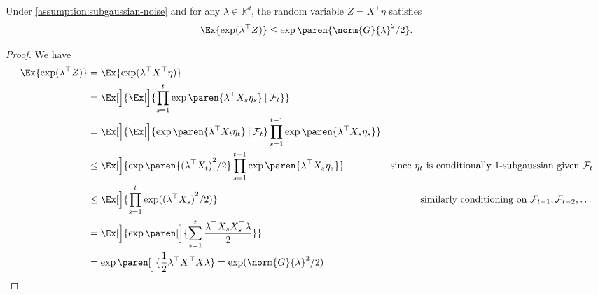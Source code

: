 \documentclass{article}
\newcommand{\Real}{\mathds{R}}
\newcommand\given[1][\delimsize]{%
  \providecommand{\delimsize}{}
  \nonscript\:#1\vert\allowbreak\nonscript\:\mathopen{}
}
\DeclarePairedDelimiter{\paren}()
\providecommand\transp{\top}
\let\transpsymbol\transp
\renewcommand{\transp}[1]{#1^\transpsymbol}
\begin{document}
\begin{lemma}\label{lemma:subgaussian-z}
  Under \cref{assumption:subgaussian-noise} and for any
$\lambda\in\Real^d$, the random variable $Z = \transp{X}\eta$ satisfies
  \begin{align*}
    \Ex{\exp(\transp{\lambda}Z)} \le \exp\paren{\norm{G}{\lambda}^2/2}.
  \end{align*}

  \begin{proof}
    We have
    \begin{align*}
      \Ex{\exp(\transp{\lambda}Z)}
      &= \Ex{\exp(\transp{\lambda}\transp{X}\eta)} \\
      &= \Ex[\Big]{\Ex[\Big]{\prod_{s=1}^t \exp\paren{\transp{\lambda}X_s\eta_s} \given \mathcal{F}_t}} \\
      &= \Ex[\Big]{\Ex[\Big]{\exp\paren{\transp{\lambda}X_t\eta_t} \given \mathcal{F}_t} \prod_{s=1}^{t-1} \exp\paren{\transp{\lambda}X_s\eta_s}} \\
      &\le \Ex[\Big]{\exp\paren{{(\transp{\lambda}X_t)}^2/2}
        \prod_{s=1}^{t-1} \exp\paren{\transp{\lambda}X_s\eta_s}}
      &\text{since $\eta_t$ is conditionally 1-subgaussian given $\mathcal{F}_t$}\\
      &\le \Ex[\Big]{\prod_{s=1}^t\exp({(\transp{\lambda}X_s)}^2/2)}
      &\text{similarly conditioning on $\mathcal{F}_{t-1},\mathcal{F}_{t-2},\dotsc$}\\
      &= \Ex[\Big]{\exp\paren[\Big]{\sum_{s=1}^t\frac{\transp{\lambda}X_s\transp{X_s}\lambda}{2}}} \\
      &= \exp\paren[\Big]{\frac{1}{2}\transp{\lambda}\transp{X}X\lambda}
        = \exp(\norm{G}{\lambda}^2/2)
      &\qedhere
    \end{align*}
  \end{proof}
\end{lemma}
\end{document}
